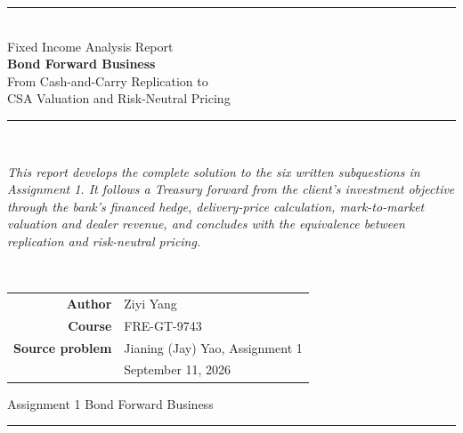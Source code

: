 \documentclass[11pt]{article}
\numberwithin{equation}{section}
\begin{document}
\setlength{\abovedisplayskip}{7pt}
\setlength{\belowdisplayskip}{7pt}
\setlength{\abovedisplayshortskip}{3pt}
\setlength{\belowdisplayshortskip}{4pt}
\setlength{\jot}{2pt}
\hypersetup{pageanchor=false}

\begin{titlepage}
\thispagestyle{empty}
\centering
\vspace*{0.55in}
{\color{NYUviolet}\rule{\textwidth}{2.2pt}}\\[10pt]
{\sffamily\fontsize{16}{19}\selectfont\color{inkgrey}
Fixed Income Analysis Report}\\[14pt]
{\sffamily\bfseries\fontsize{25}{30}\selectfont\color{NYUviolet}
Bond Forward Business}\\[14pt]
{\sffamily\fontsize{15}{18}\selectfont\color{inkgrey}
From Cash-and-Carry Replication to\\[3pt]
CSA Valuation and Risk-Neutral Pricing}\\[10pt]
{\color{NYUviolet}\rule{\textwidth}{2.2pt}}\\[24pt]
\begin{minipage}{0.88\textwidth}
\centering\itshape\small\color{inkgrey}
This report develops the complete solution to the six written subquestions
in Assignment 1. It follows a Treasury forward from the client's investment
objective through the bank's financed hedge, delivery-price calculation,
mark-to-market valuation and dealer revenue, and concludes with the
equivalence between replication and risk-neutral pricing.
\end{minipage}\\[34pt]
\begin{tabular}{rl}
\sffamily\bfseries Author & Ziyi Yang\\[3pt]
\sffamily\bfseries Course & FRE-GT-9743\\[3pt]
\sffamily\bfseries Source problem & Jianing (Jay) Yao, Assignment 1\\[3pt]
 & September 11, 2026
\end{tabular}
\vfill
{\sffamily\small\color{inkgrey}Assignment 1 \quad\textbullet\quad Bond Forward Business}\\[2pt]
{\color{NYUviolet}\rule{\textwidth}{1.2pt}}
\end{titlepage}
\hypersetup{pageanchor=true}
\end{document}
